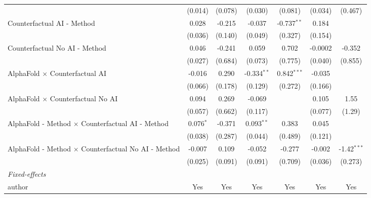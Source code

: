 \begin{tabular}{lcccccc}
                                                              & (0.014)     & (0.078)       & (0.030)       & (0.081)       & (0.034)     & (0.467)\\   
   Counterfactual AI - Method                                 & 0.028       & -0.215        & -0.037        & -0.737$^{**}$ & 0.184       &   \\   
                                                              & (0.036)     & (0.140)       & (0.049)       & (0.327)       & (0.154)     &   \\   
   Counterfactual No AI - Method                              & 0.046       & -0.241        & 0.059         & 0.702         & -0.0002     & -0.352\\   
                                                              & (0.027)     & (0.684)       & (0.073)       & (0.775)       & (0.040)     & (0.855)\\   
   AlphaFold $\times$ Counterfactual AI                       & -0.016      & 0.290         & -0.334$^{**}$ & 0.842$^{***}$ & -0.035      &   \\   
                                                              & (0.066)     & (0.178)       & (0.129)       & (0.272)       & (0.166)     &   \\   
   AlphaFold $\times$ Counterfactual No AI                    & 0.094       & 0.269         & -0.069        &               & 0.105       & 1.55\\   
                                                              & (0.057)     & (0.662)       & (0.117)       &               & (0.077)     & (1.29)\\   
   AlphaFold - Method $\times$ Counterfactual AI - Method     & 0.076$^{*}$ & -0.371        & 0.093$^{**}$  & 0.383         & 0.045       &   \\   
                                                              & (0.038)     & (0.287)       & (0.044)       & (0.489)       & (0.121)     &   \\   
   AlphaFold - Method $\times$ Counterfactual No AI - Method  & -0.007      & 0.109         & -0.052        & -0.277        & -0.002      & -1.42$^{***}$\\   
                                                              & (0.025)     & (0.091)       & (0.091)       & (0.709)       & (0.036)     & (0.273)\\   
   \midrule
   \emph{Fixed-effects}\\
   author                                                     & Yes         & Yes           & Yes           & Yes           & Yes         & Yes\\  

\end{tabular}
